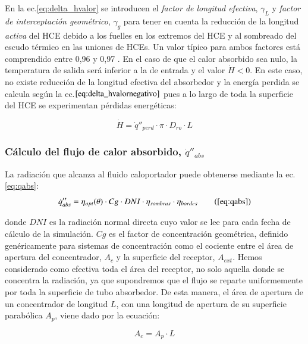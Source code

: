 En la ec.\ref{eq:delta_hvalor} se introducen el \textit{factor de longitud efectiva}, \(\gamma_L\) y \textit{factor de interceptación geométrico}, \(\gamma_g\) para tener en cuenta la reducción de la longitud \textit{activa} del HCE debido a los fuelles en los extremos del HCE y al sombreado del escudo térmico en las uniones de HCEs. Un valor típico para ambos factores está comprendido entre 0,96 y 0,97 \cite{zarzaApuntesMasterConsultor2006}. En el caso de que el calor absorbido sea nulo, la temperatura de salida será inferior a la de entrada y el valor \(\dot H < 0\). En este caso, no existe reducción de la longitud efectiva del absorbedor y la energía perdida se calcula según la ec.\(\eqref{eq:delta_hvalornegativo}\) pues a lo largo de toda la superficie del HCE se experimentan pérdidas energéticas:

\begin{equation}
   \dot H =  \dot q''_{perd} \cdot \pi \cdot D_{ro} \cdot L
    \label{eq:delta_hvalornegativo}
\end{equation}

\subsubsection{Cálculo del flujo de calor absorbido, $\dot q''_{abs}$}

La radiación que alcanza al fluido caloportador puede obtenerse mediante la ec.\ref{eq:qabs}:
\begin{equation}
\notag \dot q''_{abs}= \eta_{opt}(\theta) \cdot Cg \cdot DNI \cdot \eta_{sombras} \cdot \eta_{bordes}  \tag{\ref{eq:qabs}}
\end{equation}

donde \(DNI\) es la radiación normal directa cuyo valor se lee para cada  fecha de cálculo de la simulación. \(Cg\) es el factor de concentración geométrica, definido genéricamente   para sistemas de concentración como el cociente entre el área de  apertura del concentrador, \(A_c\) y la superficie del receptor,   \(A_{ext}\). Hemos considerado como efectiva toda el área del receptor, no solo aquella donde se concentra la radiación, ya que supondremos que el flujo se reparte uniformemente por toda la superficie de tubo absorbedor. De esta manera, el área de apertura de un concentrador de longitud $L$, con una longitud de apertura de su superficie parabólica $A_p$, viene dado por la ecuación:

\begin{equation}
   A_c = A_p \cdot L
    \label{eq:aperturaconcentrador}
\end{equation}

